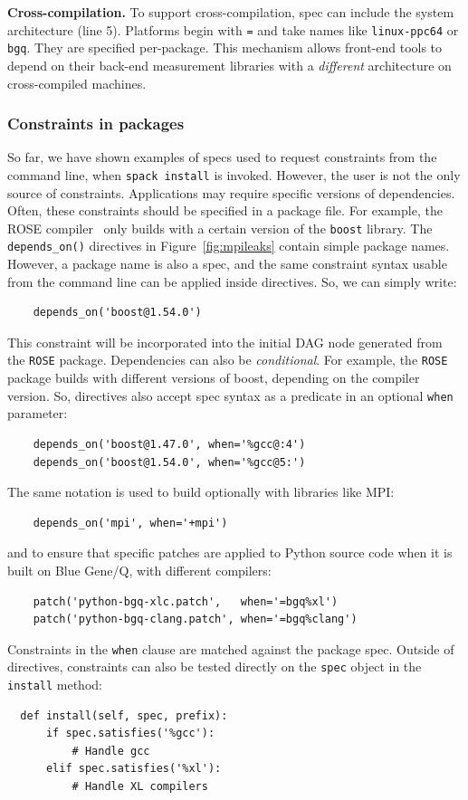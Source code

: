 {\bf Cross-compilation.}
To support cross-compilation, spec can include the system architecture 
(line 5). Platforms begin with {\tt =} and take names like {\tt linux-ppc64} 
or {\tt bgq}.  They are specified per-package. This mechanism allows front-end 
tools to depend on their back-end measurement
libraries with a {\it different} architecture on cross-compiled machines.

\subsubsection{Constraints in packages}\label{sec:constraints}

So far, we have shown examples of specs used to request constraints from the
command line, when {\tt spack install} is invoked.  However, the user is not 
the only source of constraints.  Applications may require specific versions 
of dependencies. Often, these constraints should be specified in a package 
file.  For
example, the ROSE compiler~\cite{rose} only builds with a certain version of the {\tt boost} library.
The {\tt depends\_on()} directives in Figure~\ref{fig:mpileaks} contain
simple package names.  However, a package name is also a spec, and
the same constraint syntax usable from the command line can be applied inside directives.
So, we can simply write:
%
\begin{verbatim}
    depends_on('boost@1.54.0')
\end{verbatim}
%
This constraint will be incorporated into the initial DAG node generated from
the {\tt ROSE} package.  Dependencies can also be {\it conditional}.  For example,
the {\tt ROSE} package builds with different versions of boost, depending on the
compiler version. So, directives also accept spec syntax as a
predicate in an optional {\tt when} parameter:
%
\begin{verbatim}
    depends_on('boost@1.47.0', when='%gcc@:4')
    depends_on('boost@1.54.0', when='%gcc@5:')
\end{verbatim}
%
\vfill\eject
\noindent
The same notation is used to build optionally with libraries like MPI:
%
\begin{verbatim}
    depends_on('mpi', when='+mpi')
\end{verbatim}
%
and to ensure that specific patches are applied to Python source code
when it is built on Blue Gene/Q, with different compilers:
%
\begin{verbatim}
    patch('python-bgq-xlc.patch',   when='=bgq%xl')
    patch('python-bgq-clang.patch', when='=bgq%clang')
\end{verbatim}
%
Constraints in the {\tt when} clause are matched against the package spec.
Outside of directives, constraints can also be tested directly on the {\tt spec}
object in the {\tt install} method:
%
\begin{verbatim}
  def install(self, spec, prefix):
      if spec.satisfies('%gcc'):
          # Handle gcc
      elif spec.satisfies('%xl'):
          # Handle XL compilers
\end{verbatim}
%

